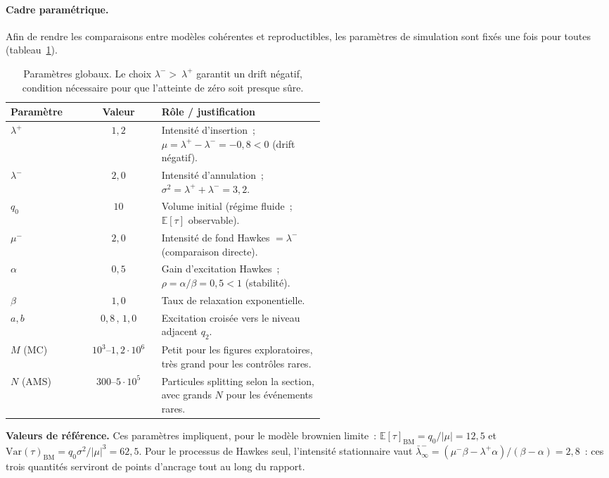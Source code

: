 \documentclass[11pt,a4paper]{article}
\theoremstyle{definition}
\newcommand{\E}{\mathbb{E}}
\newcommand{\Var}{\mathrm{Var}}
\begin{document}
\paragraph{Cadre paramétrique.}
Afin de rendre les comparaisons entre modèles cohérentes et reproductibles,
les paramètres de simulation sont fixés une fois pour toutes (tableau~\ref{tab:params}).

\begin{table}[H]
\centering\small
\begin{tabular}{@{}lcp{0.52\linewidth}@{}}
\toprule
Paramètre & Valeur & Rôle / justification \\
\midrule
$\lambda^+$ & $1{,}2$ & Intensité d'insertion~; $\mu=\lambda^+-\lambda^-=-0{,}8<0$ (drift négatif). \\
$\lambda^-$ & $2{,}0$ & Intensité d'annulation~; $\sigma^2=\lambda^++\lambda^-=3{,}2$. \\
$q_0$ & $10$ & Volume initial (régime fluide~; $\E[\tau]$ observable). \\
$\mu^-$ & $2{,}0$ & Intensité de fond Hawkes $=\lambda^-$ (comparaison directe). \\
$\alpha$ & $0{,}5$ & Gain d'excitation Hawkes~; $\rho=\alpha/\beta=0{,}5<1$ (stabilité). \\
$\beta$ & $1{,}0$ & Taux de relaxation exponentielle. \\
$a,b$ & $0{,}8\,,\,1{,}0$ & Excitation croisée vers le niveau adjacent $q_2$. \\
$M$ (MC) & $10^3$--$1{,}2\!\cdot\!10^6$ & Petit pour les figures exploratoires, très grand pour les contrôles rares. \\
$N$ (AMS) & $300$--$5\!\cdot\!10^5$ & Particules splitting selon la section, avec grands $N$ pour les événements rares. \\
\bottomrule
\end{tabular}
\caption{Paramètres globaux. Le choix $\lambda^->\ \lambda^+$ garantit un drift
négatif, condition nécessaire pour que l'atteinte de zéro soit presque sûre.}
\label{tab:params}
\end{table}

\textbf{Valeurs de référence.}
Ces paramètres impliquent, pour le modèle brownien limite~:
$\E[\tau]_\mathrm{BM}=q_0/|\mu|=12{,}5$ et $\Var(\tau)_\mathrm{BM}=q_0\sigma^2/|\mu|^3=62{,}5$.
Pour le processus de Hawkes seul, l'intensité stationnaire vaut
$\bar\lambda^-_\infty=(\mu^-\beta-\lambda^+\alpha)/(\beta-\alpha)=2{,}8$~:
ces trois quantités serviront de points d'ancrage tout au long du rapport.
\end{document}
